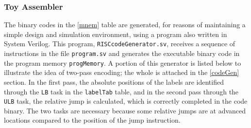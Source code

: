 \subsubsection{Toy Assembler}

The binary codes in the \ref{mnem} table are generated, for reasons of maintaining a simple design and simulation environment, using a program also written in System Verilog. This program, {\tt RISCcodeGenerator.sv}, receives a sequence of instructions in the file {\tt program.sv} and generates the executable binary code in the program memory {\tt progMemory}. A portion of this generator is listed below to illustrate the idea of two-pass encoding; the whole is attached in the \ref{codeGen} section. In the first pass, the absolute positions of the labels are identified through the {\tt LB} task in the {\tt labelTab} table, and in the second pass through the {\tt ULB} task, the relative jump is calculated, which is correctly completed in the code binary. The two tasks are necessary because some relative jumps are at advanced locations compared to the position of the jump instruction.
